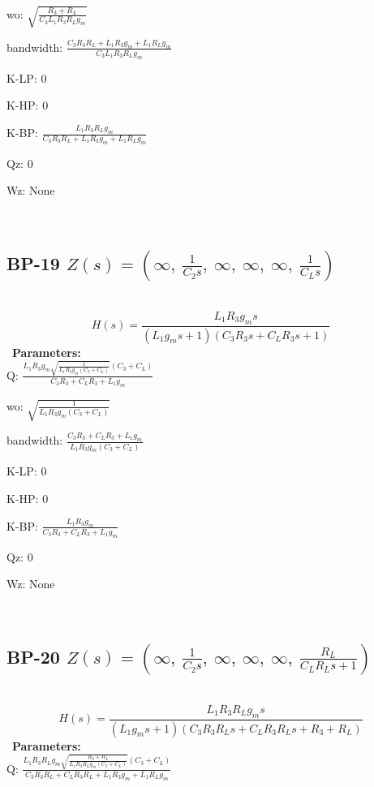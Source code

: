 \documentclass{article}
\begin{document}
wo: $\sqrt{\frac{R_{3} + R_{L}}{C_{3} L_{1} R_{3} R_{L} g_{m}}}$\ 

bandwidth: $\frac{C_{3} R_{3} R_{L} + L_{1} R_{3} g_{m} + L_{1} R_{L} g_{m}}{C_{3} L_{1} R_{3} R_{L} g_{m}}$\ 

K-LP: $0$\ 

K-HP: $0$\ 

K-BP: $\frac{L_{1} R_{3} R_{L} g_{m}}{C_{3} R_{3} R_{L} + L_{1} R_{3} g_{m} + L_{1} R_{L} g_{m}}$\ 

Qz: $0$\ 

Wz: $\text{None}$\ 

\ 

\subsection{BP-19 $Z(s) = \left( \infty, \  \frac{1}{C_{2} s}, \  \infty, \  \infty, \  \infty, \  \frac{1}{C_{L} s}\right)$ } \ 
\textbf{\[H(s) = \frac{L_{1} R_{3} g_{m} s}{\left(L_{1} g_{m} s + 1\right) \left(C_{3} R_{3} s + C_{L} R_{3} s + 1\right)}\] } \ 
\textbf{Parameters:}\\ 

Q: $\frac{L_{1} R_{3} g_{m} \sqrt{\frac{1}{L_{1} R_{3} g_{m} \left(C_{3} + C_{L}\right)}} \left(C_{3} + C_{L}\right)}{C_{3} R_{3} + C_{L} R_{3} + L_{1} g_{m}}$\ 

wo: $\sqrt{\frac{1}{L_{1} R_{3} g_{m} \left(C_{3} + C_{L}\right)}}$\ 

bandwidth: $\frac{C_{3} R_{3} + C_{L} R_{3} + L_{1} g_{m}}{L_{1} R_{3} g_{m} \left(C_{3} + C_{L}\right)}$\ 

K-LP: $0$\ 

K-HP: $0$\ 

K-BP: $\frac{L_{1} R_{3} g_{m}}{C_{3} R_{3} + C_{L} R_{3} + L_{1} g_{m}}$\ 

Qz: $0$\ 

Wz: $\text{None}$\ 

\ 

\subsection{BP-20 $Z(s) = \left( \infty, \  \frac{1}{C_{2} s}, \  \infty, \  \infty, \  \infty, \  \frac{R_{L}}{C_{L} R_{L} s + 1}\right)$ } \ 
\textbf{\[H(s) = \frac{L_{1} R_{3} R_{L} g_{m} s}{\left(L_{1} g_{m} s + 1\right) \left(C_{3} R_{3} R_{L} s + C_{L} R_{3} R_{L} s + R_{3} + R_{L}\right)}\] } \ 
\textbf{Parameters:}\\ 

Q: $\frac{L_{1} R_{3} R_{L} g_{m} \sqrt{\frac{R_{3} + R_{L}}{L_{1} R_{3} R_{L} g_{m} \left(C_{3} + C_{L}\right)}} \left(C_{3} + C_{L}\right)}{C_{3} R_{3} R_{L} + C_{L} R_{3} R_{L} + L_{1} R_{3} g_{m} + L_{1} R_{L} g_{m}}$\ 
\end{document}
